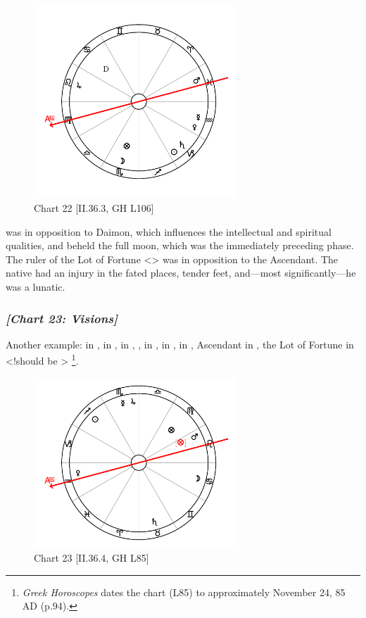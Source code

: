 \clearpage
\begin{figure}
\centering
\vspace{-30pt}
\includegraphics[width=0.68\textwidth]{charts/2_36_3}
\caption{Chart 22 [II.36.3, GH L106]}
\label{fig:chart22}
\end{figure}

\noindent \Saturn was in opposition to Daimon, which influences the intellectual and spiritual qualities, and \Saturn\xspace beheld the full moon, which was the immediately preceding phase. The ruler of the Lot of Fortune <\Mars> was in opposition to the Ascendant. The native had an injury in the fated places, tender feet, and—most significantly—he was a lunatic. 

\newpage
\subsubsection{\textit{[Chart 23: Visions]}}
Another example: \Sun\xspace in \Sagittarius, \Moon\xspace in \Cancer, \Saturn\xspace in \Taurus, \Jupiter, \Mercury\xspace in \Scorpio, \Mars\xspace in \Leo, \Venus\xspace in \Capricorn, Ascendant in \Aquarius, the Lot of Fortune in \Leo <!should be \Virgo>
\footnote{\textit{Greek Horoscopes} dates the chart (L85) to approximately November 24, 85 AD (p.94).}.

\clearpage
\begin{figure}
\centering
\vspace{-20pt}
\includegraphics[width=0.68\textwidth]{charts/2_36_4}
\caption{Chart 23 [II.36.4, GH L85]}
\label{fig:chart23}
\end{figure}

